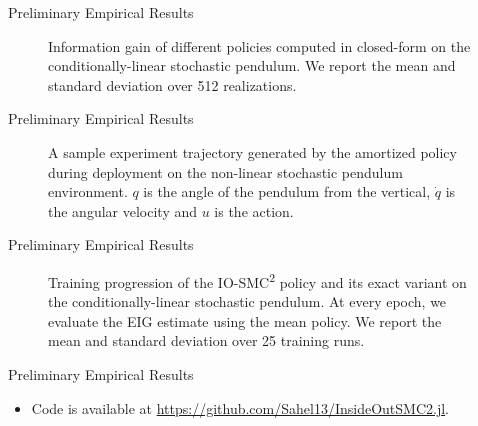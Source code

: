 \documentclass[10pt, aspectratio=1610]{beamer}
\begin{document}
    \begin{frame}{Preliminary Empirical Results}
      \begin{figure}[t]
        
        \vspace{-0.25cm}
        \caption{Information gain of different policies computed in closed-form on the conditionally-linear stochastic pendulum. We report the mean and standard deviation over 512 realizations.}
        \label{fig:pendulum_info_gain}
      \end{figure}
    \end{frame}

    \begin{frame}{Preliminary Empirical Results}
      \begin{figure}[!h]
        \centering
        
        \vspace{-0.25cm}
        \caption{A sample experiment trajectory generated by the amortized policy during deployment on the non-linear stochastic pendulum environment. $q$ is the angle of the pendulum from the vertical, $\dot{q}$ is the angular velocity and $u$ is the action.}
      \end{figure}
    \end{frame}

    \begin{frame}{Preliminary Empirical Results}
      \begin{figure}[t]
        
        \caption{Training progression of the IO-SMC\textsuperscript{2} policy and its exact variant on the conditionally-linear stochastic pendulum. At every epoch, we evaluate the EIG estimate using the mean policy. We report the mean and standard deviation over 25 training runs.}
      \end{figure}
    \end{frame}

    \begin{frame}{Preliminary Empirical Results}
      \begin{itemize}
        \item Code is available at \url{https://github.com/Sahel13/InsideOutSMC2.jl}.
      \end{itemize}
    \end{frame}
\end{document}
